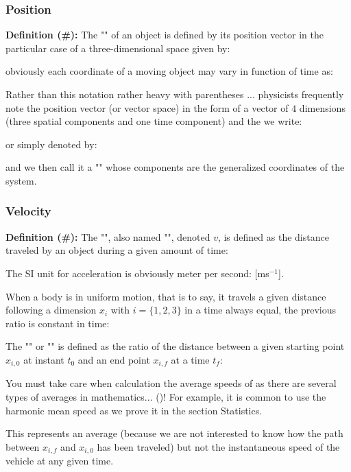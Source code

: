 	\pagebreak
	\subsubsection{Position}
	\textbf{Definition (\#\mydef):} The "" of an object is defined by its position vector in the particular case of a three-dimensional space given by:
	
	obviously each coordinate of a moving object may vary in function of time as:
	
	Rather than this notation rather heavy with parentheses ... physicists frequently note the position vector (or vector space) in the form of a vector of $4$ dimensions (three spatial components and one time component) and the we write:
	
	or simply denoted by:
	
	and we then call it a "" whose components are the generalized coordinates of the system.
	
	\subsubsection{Velocity}
	\textbf{Definition (\#\mydef):} The "", also named "", denoted $v$, is defined as the distance traveled by an object during a given amount of time:
	
	The SI unit for acceleration is obviously meter per second: [ms$^{-1}$].
	
	When a body is in uniform motion, that is to say, it travels a given distance following a dimension $x_i$ with $i=\{1,2,3\}$ in a time always equal, the previous ratio is constant in time:
	
	The "" or "" is defined as the ratio of the distance between a given starting point $x_{i,0}$ at instant $t_0$ and an end point $x_{i,f}$ at a time $t_f$:
	
	\begin{tcolorbox}[title=Remark,colframe=black,arc=10pt]
	You must take care when calculation the average speeds of as there are several types of averages in mathematics... ()! For example, it is common to use the harmonic mean speed as we prove it in the section Statistics.
	\end{tcolorbox}
	This represents an average (because we are not interested to know how the path between $x_{i,f}$ and $x_{i,0}$ has been traveled) but not the instantaneous speed of the vehicle at any given time.
	

